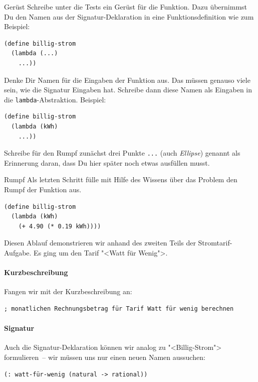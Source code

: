 \begin{konstruktionsanleitung}{Gerüst}
  \label{ka:geruest}
  Schreibe unter die Tests ein Gerüst für die Funktion. Dazu
  übernimmst Du den Namen aus der Signatur-Deklaration in eine
  Funktionsdefinition wie zum Beispiel:
\begin{lstlisting}
(define billig-strom
  (lambda (...)
    ...))
\end{lstlisting}
  Denke Dir Namen für die Eingaben der Funktion aus.  Das müssen
  genauso viele sein, wie die Signatur Eingaben hat.  Schreibe dann
  diese Namen als Eingaben in die \lstinline{lambda}-Abstraktion.
  Beispiel:
  \begin{lstlisting}
(define billig-strom
  (lambda (kWh)
    ...))
\end{lstlisting}
  Schreibe für den Rumpf zunächst drei Punkte \lstinline{...} (auch
  \textit{Ellipse}) genannt als Erinnerung daran, dass
  Du hier später noch etwas ausfüllen musst.
\end{konstruktionsanleitung}

\begin{konstruktionsanleitung}{Rumpf}
  \label{ka:rumpf}
  Als letzten Schritt fülle mit Hilfe des Wissens über das Problem
  den Rumpf der Funktion aus.
\begin{lstlisting}
(define billig-strom
  (lambda (kWh)
    (+ 4.90 (* 0.19 kWh))))
\end{lstlisting}
\end{konstruktionsanleitung}

Diesen Ablauf demonstrieren wir anhand des zweiten Teils der
Stromtarif-Aufgabe.
Es ging um den Tarif
"<Watt für Wenig">.

\paragraph{Kurzbeschreibung}

Fangen wir mit der Kurzbeschreibung an:
\begin{lstlisting}
; monatlichen Rechnungsbetrag für Tarif Watt für wenig berechnen
\end{lstlisting}

\paragraph{Signatur}

Auch die Signatur-Deklaration können wir analog zu "<Billig-Strom">
formulieren~-- wir müssen uns nur einen neuen Namen aussuchen:
%
\begin{lstlisting}
(: watt-für-wenig (natural -> rational))
\end{lstlisting}

